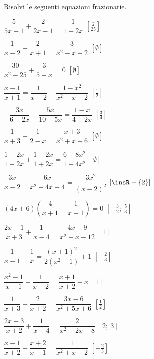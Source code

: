 \begin{esercizio}[\Ast]
\label{ese:20.21}
Risolvi le seguenti equazioni frazionarie.
\begin{multicols}{2}
\begin{enumeratea}
 \item $\dfrac{5}{5x+1}+\dfrac{2}{2x-1}=\dfrac{1}{1-2x}$
  \hfill $\left[\frac{2}{25}\right]$
 \item $\dfrac{1}{x-2}+\dfrac{2}{x+1}=\dfrac{3}{x^{2}-x-2}$
  \hfill $\left[\emptyset\right]$
 \item $\dfrac{30}{x^{2}-25}+\dfrac{3}{5-x}=0$
  \hfill $\left[\emptyset\right]$
 \item $\dfrac{x-1}{x+1}=\dfrac{1}{x-2}-\dfrac{1-x^{2}}{x^{2}-x-2}$
  \hfill $\left[\frac{1}{2}\right]$
 \item $-{\dfrac{3x}{6-2x}}+\dfrac{5x}{10-5x}=\dfrac{1-x}{4-2x}$
  \hfill $\left[\frac{3}{4}\right]$
 \item $\dfrac{1}{x+3}-\dfrac{1}{2-x}=\dfrac{x+3}{x^{2}+x-6}$
  \hfill $\left[\emptyset\right]$
 \item $\dfrac{1+2x}{1-2x}+\dfrac{1-2x}{1+2x}=\dfrac{6-8x^{2}}{1-4x^{2}}$
  \hfill $\left[\emptyset\right]$
 \item $\dfrac{3x}{x-2}+\dfrac{6x}{x^{2}-4x+4}=\dfrac{3x^{2}}{(x-2)^{2}}$
  \hfill $\left[\insR-\{2\}\right]$
 \item $(4x+6)\left(\dfrac{4}{x+1}-\dfrac{1}{x-1}\right)=0$
  \hfill $\left[-{\frac{3}{2}};~\frac{5}{3}\right]$
 \item $\dfrac{2x+1}{x+3}+\dfrac{1}{x-4}=\dfrac{4x-9}{x^{2}-x-12}$
  \hfill $\left[1\right]$
 \item $\dfrac{1}{x-1}-\dfrac{1}{x}=\dfrac{(x+1)^{2}}{2(x^{2}-1)}+1$
  \hfill $\left[-{\frac{2}{3}}\right]$
 \item $\dfrac{x^{2}-1}{x+1}-\dfrac{1}{x+2}=\dfrac{x+1}{x+2}-x$
  \hfill $\left[1\right]$
 \item $\dfrac{1}{x+3}-\dfrac{2}{x+2}=\dfrac{3x-6}{x^{2}+5x+6}$
  \hfill $\left[\frac{1}{2}\right]$
 \item $\dfrac{2x-3}{x+2}+\dfrac{1}{x-4}=\dfrac{2}{x^{2}-2x-8}$
  \hfill $\left[2;~3\right]$
 \item $\dfrac{x-1}{x+2}-\dfrac{x+2}{x-1}=\dfrac{1}{x^{2}+x-2}$
  \hfill $\left[-\frac{2}{3}\right]$
\end{enumeratea}
\end{multicols}
\end{esercizio}

